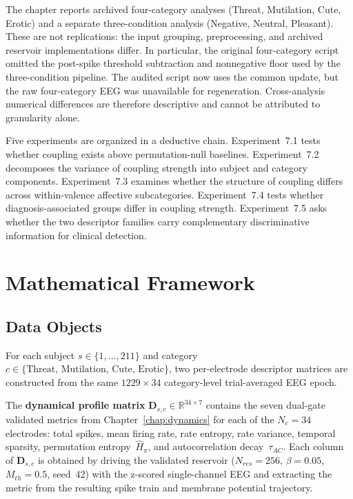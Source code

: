 The chapter reports archived four-category analyses (Threat, Mutilation, Cute, Erotic) and a separate three-condition analysis (Negative, Neutral, Pleasant). These are not replications: the input grouping, preprocessing, and archived reservoir implementations differ. In particular, the original four-category script omitted the post-spike threshold subtraction and nonnegative floor used by the three-condition pipeline. The audited script now uses the common update, but the raw four-category EEG was unavailable for regeneration. Cross-analysis numerical differences are therefore descriptive and cannot be attributed to granularity alone.

Five experiments are organized in a deductive chain. Experiment~7.1 tests whether coupling exists above permutation-null baselines. Experiment~7.2 decomposes the variance of coupling strength into subject and category components. Experiment~7.3 examines whether the structure of coupling differs across within-valence affective subcategories. Experiment~7.4 tests whether diagnosis-associated groups differ in coupling strength. Experiment~7.5 asks whether the two descriptor families carry complementary discriminative information for clinical detection.


\section{Mathematical Framework}
\label{sec:ch7_framework}

\subsection{Data Objects}

For each subject $s \in \{1,\ldots,211\}$ and category $c \in \{\text{Threat, Mutilation, Cute, Erotic}\}$, two per-electrode descriptor matrices are constructed from the same $1229 \times 34$ category-level trial-averaged EEG epoch.

The \textbf{dynamical profile matrix} $\mathbf{D}_{s,c} \in \mathbb{R}^{34 \times 7}$ contains the seven dual-gate validated metrics from Chapter~\ref{chap:dynamics} for each of the $N_c = 34$ electrodes: total spikes, mean firing rate, rate entropy, rate variance, temporal sparsity, permutation entropy~$\hat{H}_\pi$, and autocorrelation decay~$\tau_{AC}$. Each column of $\mathbf{D}_{s,c}$ is obtained by driving the validated reservoir ($N_{res}=256$, $\beta=0.05$, $M_{th}=0.5$, seed~42) with the z-scored single-channel EEG and extracting the metric from the resulting spike train and membrane potential trajectory.

